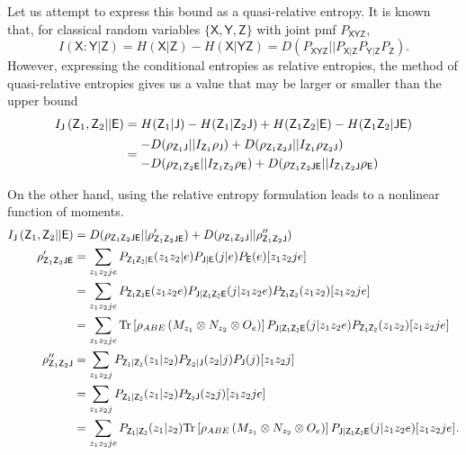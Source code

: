 \documentclass[10pt, a4paper]{article}
\numberwithin{equation}{section} %
\theoremstyle{definition}
\theoremstyle{plain}
\newcommand{\?}{\mathrel{?}} %
\newcommand{\Tr}{\mathrm{Tr}} %
\newcommand{\crv}[1]{\mathsf{#1}}
\newcommand{\proj}[2][]{{[#2]}_{#1}}
\begin{document}
    Let us attempt to express this bound as a quasi-relative entropy. It is known that, for classical random variables \(\{\crv{X}, \crv{Y}, \crv{Z}\}\) with joint pmf \(P_{\crv{XYZ}}\),
    \[ I(\crv{X}:\crv{Y}|\crv{Z}) = H(\crv{X}|\crv{Z}) - H(\crv{X}|\crv{YZ}) = D\left(P_{\crv{XYZ}}||P_{\crv{X}|\crv{Z}} P_{\crv{Y}|\crv{Z}} P_{\crv{Z}}\right). \]
    However, expressing the conditional entropies as relative entropies, the method of quasi-relative entropies gives us a value that may be larger or smaller than the upper bound
    \begin{align}
      \splitkey{\crv{Z}_1,\crv{Z}_2}{\crv{E}} &= H(\crv{Z}_1|\crv{J}) - H(\crv{Z}_1|\crv{Z}_2\crv{J}) + H(\crv{Z}_1\crv{Z}_2|\crv{E}) - H(\crv{Z}_1\crv{Z}_2|\crv{J}\crv{E}) \\
                 &= \begin{aligned}[c]
                   - & D(\rho_{\crv{Z}_1\crv{J}}||I_{\crv{Z}_1}\rho_\crv{J}) + D(\rho_{\crv{Z}_1\crv{Z}_2\crv{J}}||I_{\crv{Z}_1}\rho_{\crv{Z}_2\crv{J}}) \\
                   - & D(\rho_{\crv{Z}_1\crv{Z}_2\crv{E}}||I_{\crv{Z}_1\crv{Z}_2}\rho_{\crv{E}}) + D(\rho_{\crv{Z}_1\crv{Z}_2\crv{JE}}||I_{\crv{Z}_1\crv{Z}_2\crv{J}}\rho_{\crv{E}})
                 \end{aligned}
    \end{align}

    On the other hand, using the relative entropy formulation leads to a nonlinear function of moments.
    \begin{align}
      \splitkey{\crv{Z}_1,\crv{Z}_2}{\crv{E}} &= D(\rho_{\crv{Z}_1\crv{Z}_2\crv{JE}}||\rho'_{\crv{Z}_1\crv{Z}_2\crv{JE}}) + D(\rho_{\crv{Z}_1\crv{Z}_2\crv{J}}||\rho''_{\crv{Z}_1\crv{Z}_2\crv{J}}) \\
      \rho'_{\crv{Z}_1\crv{Z}_2\crv{JE}} &= \sum_{z_1 z_2 j e} P_{\crv{Z_1Z_2|E}}(z_1z_2|e) P_{\crv{J|E}}(j|e) P_{\crv{E}}(e) \proj{z_1z_2je} \\
                                         &= \sum_{z_1 z_2 j e} P_{\crv{Z_1Z_2E}}(z_1z_2e) P_{\crv{J|Z_1Z_2E}}(j|z_1z_2e) P_{\crv{Z_1Z_2}}(z_1z_2)\proj{z_1z_2je} \\
                                         &= \sum_{z_1 z_2 j e} \Tr\left[\rho_{ABE} \left(M_{z_1} \otimes N_{z_2} \otimes O_e\right)\right] P_{\crv{J|Z_1Z_2E}}(j|z_1z_2e) P_{\crv{Z_1Z_2}}(z_1z_2)\proj{z_1z_2je} \\
      \rho''_{\crv{Z}_1\crv{Z}_2\crv{J}} &= \sum_{z_1 z_2 j} P_{\crv{Z_1|Z_2}}(z_1|z_2) P_{\crv{Z}_2|\crv{J}}(z_2|j) P_{\crv{J}}(j) \proj{z_1z_2j} \\
                                         &= \sum_{z_1 z_2 j} P_{\crv{Z_1|Z_2}}(z_1|z_2) P_{\crv{Z_2J}}(z_2j) \proj{z_1z_2je} \\
                                         &= \sum_{z_1 z_2 j e} P_{\crv{Z_1|Z_2}}(z_1|z_2) \Tr\left[\rho_{ABE} \left(M_{z_1} \otimes N_{z_2} \otimes O_e\right)\right] P_{\crv{J|Z_1Z_2E}}(j|z_1z_2e) \proj{z_1z_2je}.
    \end{align}
\end{document}
